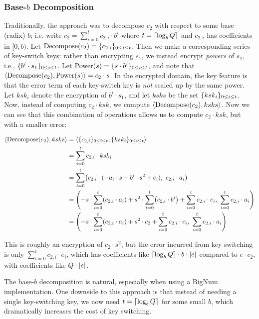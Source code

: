 \documentclass[../keyswitching.tex]{subfiles}
\begin{document}
\subsubsection{Base-$b$ Decomposition}
Traditionally, the approach was to decompose $c_2$ with respect to some base (radix) $b$; i.e. write $c_2 = \sum_{i=0}^t c_{2,i}\cdot b^i$ where $t=\lceil\log_b{Q}\rceil$ and $c_{2,i}$ has coefficients in $[0,b)$. Let $\mathrm{Decompose}(c_2) = \{c_{2,i}\}_{0\le i\le t}$. Then we make a corresponding series of key-switch keys: rather than encrypting $s_1$, we instead encrypt \emph{powers} of $s_1$, i.e., $\{b^i\cdot s_1\}_{0\le i \le t}$. Let $\mathrm{Power}(s)=\{s\cdot b^i\}_{0\le i\le t}$, and note that $\langle\mathrm{Decompose}(c_2), \mathrm{Power}(s)\rangle = c_2\cdot s$. In the encrypted domain, the key feature is that the error term of each key-switch key is \emph{not} scaled up by the same power. Let $ksk_i$ denote the encryption of $b^i\cdot s_1$, and let $ksks$ be the set $\{ksk_i\}_{0\le i\le t}$. Now, instead of computing $c_2\cdot ksk$, we compute $\langle\mathrm{Decompose}(c_2), ksks\rangle$. Now we can see that this combination of operations allows us to compute $c_2\cdot ksk$, but with a smaller error:

\begin{align*}
	\inner{\mathrm{Decompose}(c_2), ksks} &= \inner{\set{c_{2,i}}_{0\le i\le t}, \set{ksk_i}_{0\le i\le t}} \\
	&= \sum_{i=0}^t c_{2,i}\cdot ksk_i \\
	&= \sum_{i=0}^t \parens*{c_{2,i}\cdot({-a_i}\cdot s + b^i\cdot s^2 + e_i),\ c_{2,i}\cdot a_i} \\
	&= \parens*{-s\cdot \sum_{i=0}^t \parens*{c_{2,i}\cdot a_i} + s^2\cdot \sum_{i=0}^t \parens*{c_{2,i}\cdot b^i} + \sum_{i=0}^t c_{2,i}\cdot e_i,\ \sum_{i=0}^t c_{2,i}\cdot a_i} \\
	&= \parens*{-s\cdot \sum_{i=0}^t \parens*{c_{2,i}\cdot a_i} + s^2\cdot c_2 + \sum_{i=0}^t c_{2,i}\cdot e_i,\ \sum_{i=0}^t c_{2,i}\cdot a_i}
\end{align*}

This is roughly an encryption of $c_{2}\cdot s^2$, but the error incurred from key switching is only $\sum_{i=0}^t c_{2,i}\cdot e_i$, which has coefficients like $\lceil\log_b{Q}\rceil\cdot b\cdot \lvert e\rvert$ compared to $e\cdot c_2$, with coefficients like $Q\cdot \lvert e\rvert$.

The base-$b$ decomposition is natural, especially when using a BigNum implementation. One downside to this approach is that instead of needing a single key-switching key, we now need $t=\lceil\log_b{Q}\rceil$ for some small $b$, which dramatically increases the cost of key switching.
\end{document}
